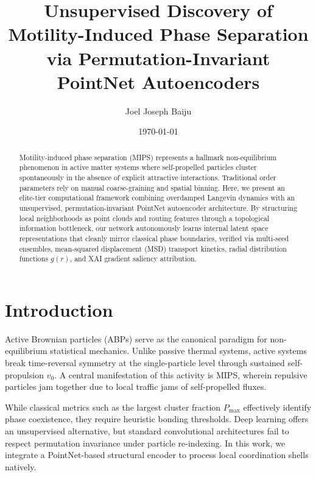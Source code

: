 \documentclass[aps,prE,twocolumn,superscriptaddress,amsmath,amssymb]{revtex4-2}
\begin{document}
\title{Unsupervised Discovery of Motility-Induced Phase Separation via Permutation-Invariant PointNet Autoencoders}

\author{Joel Joseph Baiju}

\date{\today}

\begin{abstract}
Motility-induced phase separation (MIPS) represents a hallmark non-equilibrium phenomenon in active matter systems where self-propelled particles cluster spontaneously in the absence of explicit attractive interactions. Traditional order parameters rely on manual coarse-graining and spatial binning. Here, we present an elite-tier computational framework combining overdamped Langevin dynamics with an unsupervised, permutation-invariant PointNet autoencoder architecture. By structuring local neighborhoods as point clouds and routing features through a topological information bottleneck, our network autonomously learns internal latent space representations that cleanly mirror classical phase boundaries, verified via multi-seed ensembles, mean-squared displacement (MSD) transport kinetics, radial distribution functions $g(r)$, and XAI gradient saliency attribution.
\end{abstract}

\maketitle

\section{Introduction}
Active Brownian particles (ABPs) serve as the canonical paradigm for non-equilibrium statistical mechanics. Unlike passive thermal systems, active systems break time-reversal symmetry at the single-particle level through sustained self-propulsion $v_0$. A central manifestation of this activity is MIPS, wherein repulsive particles jam together due to local traffic jams of self-propelled fluxes. 

While classical metrics such as the largest cluster fraction $P_{\text{max}}$ effectively identify phase coexistence, they require heuristic bonding thresholds. Deep learning offers an unsupervised alternative, but standard convolutional architectures fail to respect permutation invariance under particle re-indexing. In this work, we integrate a PointNet-based structural encoder to process local coordination shells natively.
\end{document}
